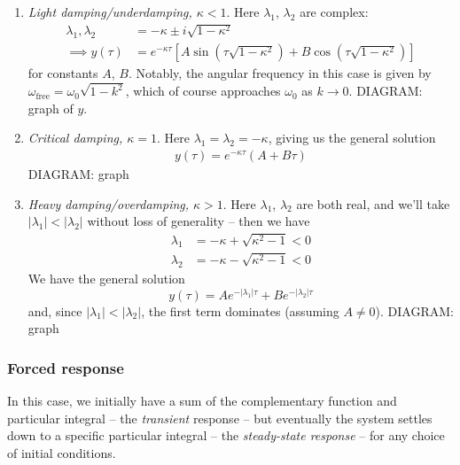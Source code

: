\documentclass{../template/note}
\begin{document}
    \begin{enumerate}[label=\protect\circled{\arabic*}]
        \item \emph{Light damping/underdamping, \(\kappa < 1\)}. Here \(\lambda_1\), \(\lambda_2\) are complex:
        \begin{align*}
            \lambda_1, \lambda_2 &= -\kappa \pm i\sqrt{1-\kappa^2} \\
            \implies y(\tau) &= e^{-\kappa \tau}\left[A\sin\left(\tau\sqrt{1-\kappa^2}\right)+B \cos\left(\tau \sqrt{1-\kappa^2}\right)\right]
        \end{align*}
        for constants \(A\), \(B\). Notably, the angular frequency in this case is given by \(\omega_\text{free} = \omega_0 \sqrt{1-k^2}\), which of course approaches \(\omega_0\) as \(k \to 0\).
        DIAGRAM: graph of \(y\).
        \item \emph{Critical damping, \(\kappa = 1\)}. Here \(\lambda_1 = \lambda_2 = -\kappa\), giving us the general solution
        \begin{align*}
            y(\tau) = e^{-\kappa \tau}(A + B \tau)
        \end{align*}
        DIAGRAM: graph
        \item \emph{Heavy damping/overdamping, \(\kappa > 1\)}. Here \(\lambda_1\), \(\lambda_2\) are both real, and we'll take \(|\lambda_1| < |\lambda_2|\) without loss of generality -- then we have
        \begin{align*}
            \lambda_1 &= -\kappa + \sqrt{\kappa^2 - 1} < 0 \\
            \lambda_2 &= -\kappa - \sqrt{\kappa^2 - 1} < 0
        \end{align*}
        We have the general solution
        \[
            y(\tau) = Ae^{-|\lambda_1|\tau} + Be^{-|\lambda_2|\tau}
        \]
        and, since \(|\lambda_1| < |\lambda_2|\), the first term dominates (assuming \(A \neq 0\)).
        DIAGRAM: graph
        
    \end{enumerate}
    
    \subsubsection{Forced response}

    In this case, we initially have a sum of the complementary function and particular integral -- the \emph{transient} response -- but eventually the system settles down to a specific particular integral -- the \emph{steady-state response} -- for any choice of initial conditions.
\end{document}
